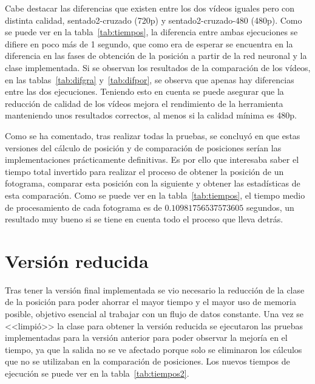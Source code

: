 Cabe destacar las diferencias que existen entre los dos vídeos iguales pero con distinta calidad, sentado2-cruzado (720p) y sentado2-cruzado-480 (480p). Como se puede ver en la tabla~\ref{tab:tiempos}, la diferencia entre ambas ejecuciones se difiere en poco más de 1 segundo, que como era de esperar se encuentra en la diferencia en las fases de obtención de la posición a partir de la red neuronal y la clase implementada. Si se observan los resultados de la comparación de los vídeos, en las tablas~\ref{tab:difgra} y~\ref{tab:difpor}, se observa que apenas hay diferencias entre las dos ejecuciones. Teniendo esto en cuenta se puede asegurar que la reducción de calidad de los vídeos mejora el rendimiento de la herramienta manteniendo unos resultados correctos, al menos si la calidad mínima es 480p.

Como se ha comentado, tras realizar todas la pruebas, se concluyó en que estas versiones del cálculo de posición y de comparación de posiciones serían las implementaciones prácticamente definitivas. Es por ello que interesaba saber el tiempo total invertido para realizar el proceso de obtener la posición de un fotograma, comparar esta posición con la siguiente y obtener las estadísticas de esta comparación. Como se puede ver en la tabla~\ref{tab:tiempos}, el tiempo medio de procesamiento de cada fotograma es de $0.10981756537573605$ segundos, un resultado muy bueno si se tiene en cuenta todo el proceso que lleva detrás.

\section{Versión reducida}
Tras tener la versión final implementada se vio necesario la reducción de la clase de la posición para poder ahorrar el mayor tiempo y el mayor uso de memoria posible, objetivo esencial al trabajar con un flujo de datos constante. Una vez se <<limpió>> la clase para obtener la versión reducida se ejecutaron las pruebas implementadas para la versión anterior para poder observar la mejoría en el tiempo, ya que la salida no se ve afectado porque solo se eliminaron los cálculos que no se utilizaban en la comparación de posiciones. Los nuevos tiempos de ejecución se puede ver en la tabla~\ref{tab:tiempos2}.

